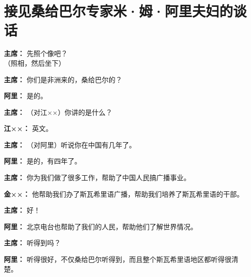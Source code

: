 \section[接见桑给巴尔专家米·姆·阿里夫妇的谈话（一九六四年六月十八日）]{接见桑给巴尔专家米·姆·阿里夫妇的谈话}

\begin{list}{}{
    \setlength{\topsep}{0pt}        %
    \setlength{\partopsep}{0pt}     %
    \setlength{\parsep}{\parskip}   %
    \setlength{\itemsep}{\lineskip}       %
    \setlength{\labelsep}{0pt}%
    \setlength{\labelwidth}{3em}%
    \setlength{\itemindent}{0pt}%
    \setlength\listparindent{\parindent}
    \setlength{\leftmargin}{3em}
    \setlength{\rightmargin}{0pt}
    }

\item[\textbf{主席：}] 先照个像吧？\\（照相，然后坐下）

\item[\textbf{主席：}] 你们是非洲来的，桑给巴尔的？

\item[\textbf{阿里：}] 是的。

\item[\textbf{主席：}] （对江××）你讲的是什么？

\item[\textbf{江××：}] 英文。

\item[\textbf{主席：}] （对阿里）听说你在中国有几年了。

\item[\textbf{阿里：}] 是的，有四年了。

\item[\textbf{主席：}] 你为我们做了很多工作，帮助了中国人民搞广播事业。

\item[\textbf{金××：}] 他帮助我们办了斯瓦希里语广播，帮助我们培养了斯瓦希里语的干部。

\item[\textbf{主席：}] 好！

\item[\textbf{阿里：}] 北京电台也帮助了我们的人民，帮助他们了解世界情况。

\item[\textbf{主席：}] 听得到吗？

\item[\textbf{阿里：}] 听得很好，不仅桑给巴尔听得到，而且整个斯瓦希里语地区都听得很清楚。


\end{list}
